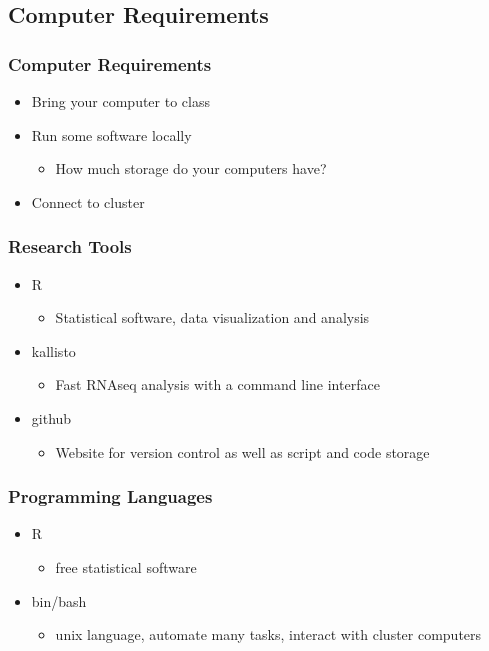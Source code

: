 \documentclass[14pt]{beamer}
\begin{document}
\subsection{Computer Requirements}
\begin{frame}
\frametitle{Computer Requirements}
\begin{itemize}
	\item Bring your computer to class
	\item Run some software locally
	\begin{itemize}
		\item How much storage do your computers have?
	\end{itemize}
	\item Connect to cluster
\end{itemize}
\end{frame}
\begin{frame}
\frametitle{Research Tools}
\begin{itemize}
	\item<1-> R
	\begin{itemize}
	\item<1-> Statistical software, data visualization and analysis
	\end{itemize}
	\item<2-> kallisto
	\begin{itemize}
	\item<2-> Fast RNAseq analysis with a command line interface
	\end{itemize}	
	\item<3-> github
	\begin{itemize}
	\item<3-> Website for version control as well as script and code storage
	\end{itemize}
\end{itemize}
\end{frame}
\begin{frame}
\frametitle{Programming Languages}
\begin{itemize}
	\item R
	\begin{itemize}
		\item free statistical software
	\end{itemize}
	\item bin/bash
	\begin{itemize}
		\item unix language, automate many tasks, interact with cluster computers
	\end{itemize}
\end{itemize}
\end{frame}
\end{document}
